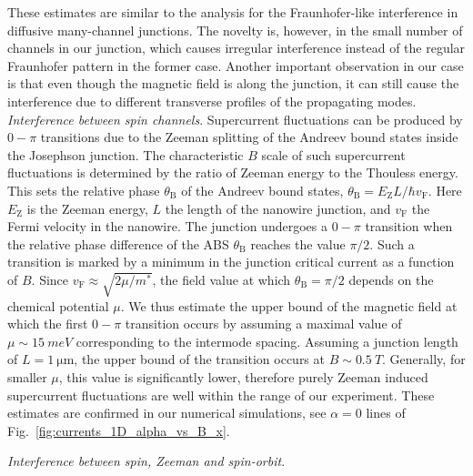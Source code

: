 These estimates are similar to the analysis for the Fraunhofer-like interference in diffusive many-channel junctions\cite{Cuevas2007}. The novelty is, however, in the small number of channels in our junction, which causes irregular interference instead of the regular Fraunhofer pattern in the former case. Another important observation in our case is that even though the magnetic field is along the junction, it can still cause the interference due to different transverse profiles of the propagating modes.\\

\textit{Interference between spin channels}.
Supercurrent fluctuations can be produced by $0-\pi$ transitions due to the Zeeman splitting of the Andreev bound states inside the Josephson junction.
The characteristic $B$ scale of such supercurrent fluctuations is determined by the ratio of Zeeman energy to the Thouless energy.
This sets the relative phase $\theta_\mathrm{B}$ of the Andreev bound states, $\theta_\mathrm{B} = E_\mathrm{Z} L / \hbar v_\mathrm{F}$.
Here $E_\mathrm{Z}$ is the Zeeman energy, $L$ the length of the nanowire junction, and $v_\mathrm{F}$ the Fermi velocity in the nanowire.
The junction undergoes a $0-\pi$ transition when the relative phase difference of the ABS $\theta_\mathrm{B}$ reaches the value $\pi/2$. Such a transition is marked by a minimum in the junction critical current as a function of $B$.
Since $v_\mathrm{F}\approx \sqrt{2\mu / m^*}$, the field value at which $\theta_\mathrm{B}=\pi/2$ depends on the chemical potential $\mu$.
We thus estimate the upper bound of the magnetic field at which the first $0-\pi$ transition occurs by assuming a maximal value of $\mu \sim \SI{15}{meV}$ corresponding to the intermode spacing\cite{Weperen2015,Kammhuber2016}.
Assuming a junction length of $L=\SI{1}{\micro\meter}$, the upper bound of the transition occurs at $B\sim \SI{0.5}{T}$.
Generally, for smaller $\mu$, this value is significantly lower, therefore purely Zeeman induced supercurrent fluctuations are well within the range of our experiment.
These estimates are confirmed in our numerical simulations, see $\alpha=0$ lines of Fig.~\ref{fig:currents_1D_alpha_vs_B_x}.

\textit{Interference between spin, Zeeman and spin-orbit}.

